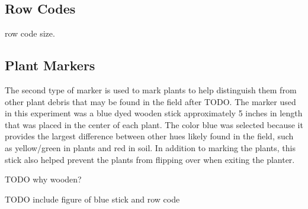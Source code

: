 \subsection{Row Codes}

row code size.

\subsection{Plant Markers}

The second type of marker is used to mark plants to help distinguish them from other plant debris that may be found in the field after TODO.  The marker used in this experiment was a blue dyed wooden stick approximately 5 inches in length that was placed in the center of each plant. The color blue was selected because it provides the largest difference between other hues likely found in the field, such as yellow/green in plants and red in soil.  In addition to marking the plants, this stick also helped prevent the plants from flipping over when exiting the planter.

TODO why wooden?

TODO include figure of blue stick and row code

